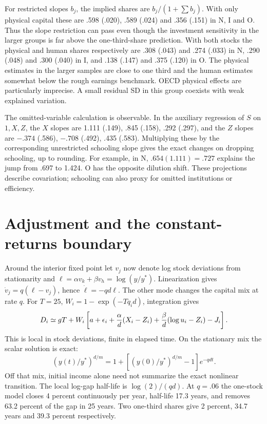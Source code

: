 \documentclass[11pt]{article}
\begin{document}
For restricted slopes $b_j$, the implied shares are $b_j/(1+\sum b_j)$. With only physical capital these are .598 (.020), .589 (.024) and .356 (.151) in N, I and O. Thus the slope restriction can pass even though the investment sensitivity in the larger groups is far above the one-third-share prediction. With both stocks the physical and human shares respectively are .308 (.043) and .274 (.033) in N, .290 (.048) and .300 (.040) in I, and .138 (.147) and .375 (.120) in O. The physical estimates in the larger samples are close to one third and the human estimates somewhat below the rough earnings benchmark. OECD physical effects are particularly imprecise. A small residual SD in this group coexists with weak explained variation.

The omitted-variable calculation is observable. In the auxiliary regression of $S$ on $1,X,Z$, the $X$ slopes are 1.111 (.149), .845 (.158), .292 (.297), and the $Z$ slopes are $-.374$ (.586), $-.708$ (.492), .435 (.583). Multiplying these by the corresponding unrestricted schooling slope gives the exact changes on dropping schooling, up to rounding. For example, in N, $.654(1.111)=.727$ explains the jump from .697 to 1.424. O has the opposite dilution shift. These projections describe covariation; schooling can also proxy for omitted institutions or efficiency.

\section{Adjustment and the constant-returns boundary}
Around the interior fixed point let $v_j$ now denote log stock deviations from stationarity and $\ell=\alpha v_k+\beta v_h=\log(y/y^*)$. Linearization gives $\dot v_j=q(\ell-v_j)$, hence $\dot\ell=-qd\ell$. The other mode changes the capital mix at rate $q$. For $T=25$, $W_i=1-\exp(-Tq_i d)$, integration gives
\[
 D_i\simeq gT+W_i\left[a+\epsilon_i+{\alpha\over d}(X_i-Z_i)
             +{\beta\over d}(\log u_i-Z_i)-J_i\right].
\]
This is local in stock deviations, finite in elapsed time. On the stationary mix the scalar solution is exact:
\[
 (y(t)/y^*)^{d/m}=1+[(y(0)/y^*)^{d/m}-1]e^{-qdt}.
\]
Off that mix, initial income alone need not summarize the exact nonlinear transition. The local log-gap half-life is $\log(2)/(qd)$. At $q=.06$ the one-stock model closes 4 percent continuously per year, half-life 17.3 years, and removes 63.2 percent of the gap in 25 years. Two one-third shares give 2 percent, 34.7 years and 39.3 percent respectively.
\end{document}
